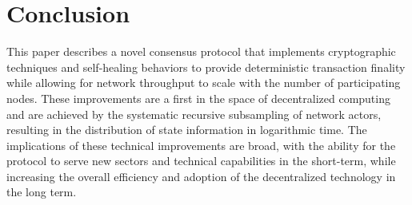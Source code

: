 \section{Conclusion}\label{conclusion}
This paper describes a novel consensus protocol that implements cryptographic techniques and self-healing behaviors to provide deterministic transaction finality while allowing for network throughput to scale with the number of participating nodes. These improvements are a first in the space of decentralized computing and are achieved by the systematic recursive subsampling of network actors, resulting in the distribution of state information in logarithmic time. The implications of these technical improvements are broad, with the ability for the protocol to serve new sectors and technical capabilities in the short-term, while increasing the overall efficiency and adoption of the decentralized technology in the long term.
